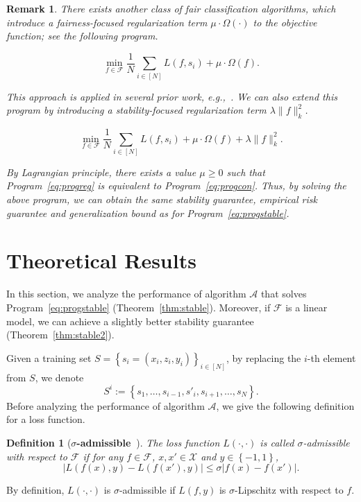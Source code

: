 \documentclass[11pt]{article}
\newtheorem{definition}[theorem]{Definition}
\newtheorem{remark}[theorem]{Remark}
\newcommand{\calA}{\mathcal{A}}
\newcommand{\calF}{\mathcal{F}}
\newcommand{\calX}{\mathcal{X}}
\begin{document}
	\begin{remark}
		There exists another class of fair classification algorithms, which introduce a fairness-focused regularization term $\mu\cdot\Omega(\cdot)$ to the objective function; see the following program. 
		\begin{tcolorbox}
			\begin{equation} \tag{RegFair}
			\label{eq:progreg}
			\min_{f\in \calF} \frac{1}{N}\sum_{i\in [N]} L(f,s_i) + \mu\cdot \Omega(f).
			\end{equation}
		\end{tcolorbox}
		\noindent
		This approach is applied in several prior work, e.g.,~\cite{kamishima2012fairness,davies2017algorithmic,goel2018non}. 
		We can also extend this program by introducing a stability-focused regularization term $\lambda\|f\|_k^2$.
		\begin{tcolorbox}
			\begin{equation*}
			\label{eq:progreg_fair}
			\min_{f\in \calF} \frac{1}{N}\sum_{i\in [N]} L(f,s_i) + \mu\cdot \Omega(f) + \lambda \|f\|_k^2.
			\end{equation*}
		\end{tcolorbox}
		
		\noindent
		By Lagrangian principle, there exists a value $\mu\geq 0$ such that Program~\eqref{eq:progreg} is equivalent to Program~\eqref{eq:progcon}.
		Thus, by solving the above program, we can obtain the same stability guarantee, empirical risk guarantee and generalization bound as for Program~\eqref{eq:progstable}.
	\end{remark}
	
	\section{Theoretical Results}
	\label{sec:alg}
	
	In this section, we analyze the performance of algorithm $\calA$ that solves Program~\eqref{eq:progstable} (Theorem~\ref{thm:stable}).
	Moreover, if $\calF$ is a linear model, we can achieve a slightly better stability guarantee (Theorem~\ref{thm:stable2}).
	
	Given a training set $S=\left\{s_i=\left(x_i,z_i,y_i\right)\right\}_{i\in [N]}$,
	by replacing the $i$-th element from $S$, we denote
	\[
	S^{i}:=\left\{s_1,\ldots,s_{i-1},s'_{i},s_{i+1},\ldots,s_N\right\}.
	\]
	Before analyzing the performance of algorithm $\calA$, we give the following definition for a  loss function.
	\begin{definition}[\textbf{$\sigma$-admissible~\cite{bousquet2002stability}}]
		\label{def:admissible}
		The loss function $L(\cdot,\cdot)$ is called $\sigma$-admissible with respect to $\calF$ if for any $f\in \calF$, $x,x'\in \calX$ and $y\in \left\{-1,1\right\}$,
		\[
		\left|L(f(x),y)-L(f(x'),y) \right| \leq \sigma \left|f(x)-f(x') \right|.
		\]
	\end{definition}
	\noindent
	By definition, $L(\cdot,\cdot)$ is $\sigma$-admissible if $L(f,y)$ is $\sigma$-Lipschitz with respect to $f$.
	
\end{document}
